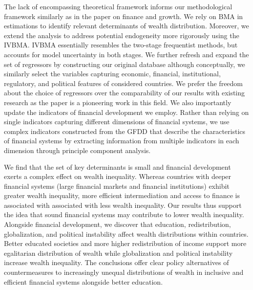 \begin{refsection}
The lack of encompassing theoretical framework informs our methodological framework similarly as in the paper on finance and growth. We rely on \ac{BMA} in estimations to identify relevant determinants of wealth distribution. Moreover, we extend the analysis to address potential endogeneity more rigorously using the \ac{IVBMA}. \ac{IVBMA} essentially resembles the two-stage frequentist methods, but accounts for model uncertainty in both stages. We further refresh and expand the set of regressors by constructing our original database although conceptually, we similarly select the variables capturing economic, financial, institutional, regulatory, and political features of considered countries. We prefer the freedom about the choice of regressors over the comparability of our results with existing research as the paper is a pioneering work in this field. We also importantly update the indicators of financial development we employ. Rather than relying on single indicators capturing different dimensions of financial systems, we use complex indicators constructed from the \ac{GFDD} that describe the characteristics of financial systems by extracting information from multiple indicators in each dimension through principle component analysis.

We find that the set of key determinants is small and financial development exerts a complex effect on wealth inequality. Whereas countries with deeper financial systems (large financial markets and financial institutions) exhibit greater wealth inequality, more efficient intermediation and access to finance is associated with associated with less wealth inequality. Our results thus support the idea that sound financial systems may contribute to lower wealth inequality. Alongside financial development, we discover that education, redistribution, globalization, and political instability affect wealth distributions within countries. Better educated societies and more higher redistribution of income support more egalitarian distribution of wealth while globalization and political instability increase wealth inequality. The conclusions offer clear policy alternatives of countermeasures to increasingly unequal distributions of wealth in inclusive and efficient financial systems alongside better education.


\end{refsection}
